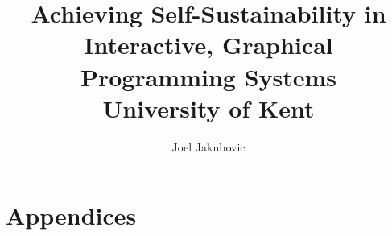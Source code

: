 \documentclass[12pt]{report}
\title{
  {Achieving Self-Sustainability in Interactive, Graphical Programming Systems}\\
  {\large University of Kent}
}
\author{Joel Jakubovic}
\begin{document}
\maketitle

\newcommand{\joel}[1]{}
\newcommand{\tomas}[1]{}
\newcommand{\tp}[1]{}
\newcommand{\note}[1]{}
\newcommand{\notes}[1]{}
\newcommand{\todo}[1]{\textbf{TODO: #1}}
\newcommand{\delete}[1]{\textbf{DELETE:}#1}
\newcommand{\naive}{na\"ive}
\newcommand{\OROM}{Id}
\newcommand{\svgel}[1]{\texttt{\textless{}#1\textgreater{}}}
\newcommand{\OSFA}{One-Size-Fits-All}
\newcommand{\xywh}{\texttt{x},\texttt{y},\texttt{width},\texttt{height}}
%
\newcommand{\mybox}[1]{\noindent\fbox{\parbox{\textwidth}{#1}}}
\providecommand{\tightlist}{}%
\newenvironment{longtable}[2]{\begin{tabular}}{\end{tabular}}
\newenvironment{head}{}{}
\newtheorem{heuristic}{Heuristic}
\newtheorem*{defn}{Definition}









\chapter*{Appendices}
\appendix




\printbibliography
\end{document}
